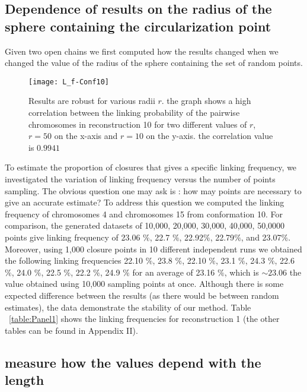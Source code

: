 \documentclass{iopart}
\begin{document}
\subsection{Dependence of results on the radius of the sphere containing the circularization point} 
Given two open chains we first computed how the results changed when we changed the value of the radius of the sphere containing the set of random points. 

\begin{figure}[!htb]
\begin{center}
\texttt{[image: L\_f-Conf10]}
\end{center}
\caption{Results are robust for various radii $r$. the graph shows a high correlation between the linking probability of the pairwise chromosomes in reconstruction 10 for   two different values of $r$, $r=50$ on the x-axis and $r=10$ on the y-axis. the correlation value is $ 0.9941$ \label{fig:L_f-Conf10}}
\end{figure}

To estimate the proportion of closures that gives a specific linking frequency, we investigated the variation of linking frequency versus the number of points sampling. The obvious question one may ask is : how may points are necessary to give an accurate estimate? To address this question we computed the linking frequency of chromosomes 4 and chromosomes 15 from conformation 10.  For comparison, the generated datasets of 10,000, 20,000, 30,000, 40,000, 50,0000 points give linking frequency of 23.06 $\%$, 22.7 $\%$, 22.92$\%$, 22.79$\%$, and 23.07$\%$.  Moreover, using 1,000  closure points in 10 different independent runs we obtained the following linking frequencies 22.10 $\%$, 23.8 $\%$, 22.10 $\%$, 23.1 $\%$, 24.3 $\%$, 22.6 $\%$, 24.0 $\%$, 22.5 $\%$, 22.2 $\%$, 24.9 $\%$ for an average of 23.16 $\%$, which is $ \sim 23.06$ the value obtained  using 10,000 sampling points at once.  Although there is some expected difference between the results (as there would be between random estimates), the data demonstrate the stability of our method. 
Table ~\ref{table:Panel1}  shows the linking frequencies for reconstruction 1 (the other tables can be found in Appendix II). 





\subsection{measure how the values depend with the length}
\end{document}
